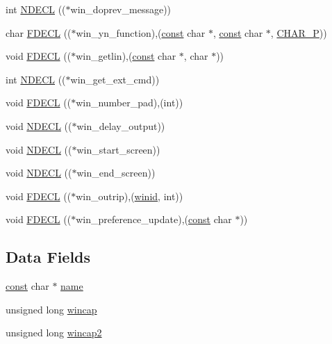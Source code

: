 \begin{DoxyCompactItemize}
\item 
int \hyperlink{structwindow__procs_ab99467e888a652c6299aa056a9cbd014}{N\+D\+E\+C\+L} (($\ast$win\+\_\+doprev\+\_\+message))
\item 
char \hyperlink{structwindow__procs_a5ed37bd6b37ed807ce9f7ab1defca062}{F\+D\+E\+C\+L} (($\ast$win\+\_\+yn\+\_\+function),(\hyperlink{tradstdc_8h_a2c212835823e3c54a8ab6d95c652660e}{const} char $\ast$, \hyperlink{tradstdc_8h_a2c212835823e3c54a8ab6d95c652660e}{const} char $\ast$, \hyperlink{wingem1_8c_ada878a8b4864a1658ee0f0acd5a89412}{C\+H\+A\+R\+\_\+\+P}))
\item 
void \hyperlink{structwindow__procs_acb074e2a8a277db7178b92caf4aeb419}{F\+D\+E\+C\+L} (($\ast$win\+\_\+getlin),(\hyperlink{tradstdc_8h_a2c212835823e3c54a8ab6d95c652660e}{const} char $\ast$, char $\ast$))
\item 
int \hyperlink{structwindow__procs_aa3c4e52764131b5aab8716d99fea10e8}{N\+D\+E\+C\+L} (($\ast$win\+\_\+get\+\_\+ext\+\_\+cmd))
\item 
void \hyperlink{structwindow__procs_ad81d8a5fe6026e72bb8a5c321e145eb2}{F\+D\+E\+C\+L} (($\ast$win\+\_\+number\+\_\+pad),(int))
\item 
void \hyperlink{structwindow__procs_a30233d5f19c1b5a90e0b418c230e5a52}{N\+D\+E\+C\+L} (($\ast$win\+\_\+delay\+\_\+output))
\item 
void \hyperlink{structwindow__procs_a4de5b504bbe3f84bc1ffaff82f165dcb}{N\+D\+E\+C\+L} (($\ast$win\+\_\+start\+\_\+screen))
\item 
void \hyperlink{structwindow__procs_a974d65b103d80ab0a3b659b2ac15c2f6}{N\+D\+E\+C\+L} (($\ast$win\+\_\+end\+\_\+screen))
\item 
void \hyperlink{structwindow__procs_a84b3677bb79325b2133c71c3da80291d}{F\+D\+E\+C\+L} (($\ast$win\+\_\+outrip),(\hyperlink{wintype_8h_adc2de956a3f084b1691cf080e1d1412b}{winid}, int))
\item 
void \hyperlink{structwindow__procs_ac254d6fd463d917a9968d6623a7b9209}{F\+D\+E\+C\+L} (($\ast$win\+\_\+preference\+\_\+update),(\hyperlink{tradstdc_8h_a2c212835823e3c54a8ab6d95c652660e}{const} char $\ast$))
\end{DoxyCompactItemize}
\subsection*{Data Fields}
\begin{DoxyCompactItemize}
\item 
\hyperlink{tradstdc_8h_a2c212835823e3c54a8ab6d95c652660e}{const} char $\ast$ \hyperlink{structwindow__procs_a3c3f9beba0ac50aabe7ce172f042e917}{name}
\item 
unsigned long \hyperlink{structwindow__procs_a94cb84de253cd788b6e311796e85e28b}{wincap}
\item 
unsigned long \hyperlink{structwindow__procs_abd823670901f2e45668dc5b535803b91}{wincap2}
\end{DoxyCompactItemize}



